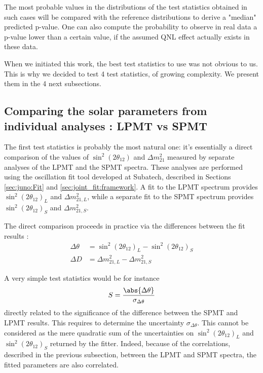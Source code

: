 \documentclass[../main.tex]{subfiles}
\begin{document}
The most probable values in the distributions of the test statistics obtained in such cases will be compared with the reference distributions to derive a "median" predicted p-value. One can also compute the probability to observe in real data a p-value lower than a certain value, if the assumed QNL effect actually exists in these data.

When we initiated this work, the best test statistics to use was not obvious to us. This is why we decided to test 4 test statistics, of growing complexity. We present them in the 4 next subsections.

\subsection{Comparing the solar parameters from individual analyses : LPMT vs SPMT}


The first test statistics is probably the most natural one: it's essentially a direct comparison of the values of $\sin^2(2\theta_{12})$ and $\Delta m^2_{21}$ measured by separate analyses of the LPMT and the SPMT spectra. These analyses are performed using the oscillation fit tool developed at Subatech, described in Sections \ref{sec:juno:Fit} and \ref{sec:joint_fit:framework}.
A fit to the LPMT spectrum provides  $\sin^2(2\theta_{12})_L$ and $\Delta m^2_{21,L}$, while a separate fit to the SPMT spectrum provides $\sin^2(2\theta_{12})_S$ and $\Delta m^2_{21,S}$.

The direct comparison proceeds in practice via the differences between the fit results :
\begin{align}
  \Delta \theta &= \sin^2(2\theta_{12})_L  - \sin^2(2\theta_{12})_S \label{eq:joint_fit:delta_t} \\
  \Delta D   &= \Delta m^2_{21,L}  - \Delta m^2_{21,S} \label{eq:joint_fit:delta_d}
\end{align}

\hfill

A very simple test statistics would be for instance
\begin{equation}
  S = \frac{\abs{ \Delta \theta}}{ \sigma_{\Delta \theta} }
\end{equation}
directly related to the significance of the difference between the SPMT and LPMT results. This requires to determine the uncertainty $\sigma_{\Delta \theta}$. This cannot be considered as the mere quadratic sum of the uncertainties on $\sin^2(2\theta_{12})_L$ and $\sin^2(2\theta_{12})_S$ returned by the fitter. Indeed, because of the correlations, described in the previous subsection, between the LPMT and SPMT spectra, the fitted parameters are also correlated.
\end{document}
